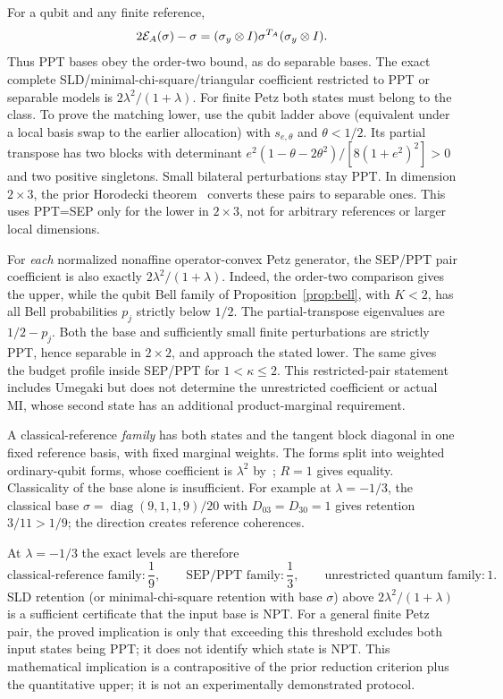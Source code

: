 For a qubit and any finite reference,
\[
 2\mathcal E_A(\sigma)-\sigma=(\sigma_y\otimes I)\sigma^{T_A}(\sigma_y\otimes I).
\]
Thus PPT bases obey the order-two bound, as do separable bases. The exact complete SLD/minimal-chi-square/triangular coefficient restricted to PPT or separable models is
\(2\lambda^2/(1+\lambda)\). For finite Petz both states must belong to the class.
To prove the matching lower, use the qubit ladder above (equivalent under a local basis swap to the earlier allocation) with \(s_{e,\theta}\) and \(\theta<1/2\). Its partial transpose has two blocks with determinant
\(e^2(1-\theta-2\theta^2)/[8(1+e^2)^2]>0\) and two positive singletons. Small bilateral perturbations stay PPT. In dimension \(2\times3\), the prior Horodecki theorem~\cite{HHH} converts these pairs to separable ones. This uses PPT=SEP only for the lower in \(2\times3\), not for arbitrary references or larger local dimensions.

For \emph{each} normalized nonaffine operator-convex Petz generator, the SEP/PPT pair coefficient is also exactly \(2\lambda^2/(1+\lambda)\). Indeed, the order-two comparison gives the upper, while the qubit Bell family of Proposition~\ref{prop:bell}, with \(K<2\), has all Bell probabilities \(p_j\) strictly below \(1/2\). The partial-transpose eigenvalues are \(1/2-p_j\). Both the base and sufficiently small finite perturbations are strictly PPT, hence separable in \(2\times2\), and approach the stated lower. The same gives the budget profile inside SEP/PPT for \(1<\kappa\le2\). This restricted-pair statement includes Umegaki but does not determine the unrestricted coefficient or actual MI, whose second state has an additional product-marginal requirement.

A classical-reference \emph{family} has both states and the tangent block diagonal in one fixed reference basis, with fixed marginal weights. The forms split into weighted ordinary-qubit forms, whose coefficient is \(\lambda^2\) by~\cite{HR}; \(R=1\) gives equality. Classicality of the base alone is insufficient. For example at \(\lambda=-1/3\), the classical base \(\sigma=\operatorname{diag}(9,1,1,9)/20\) with \(D_{03}=D_{30}=1\) gives retention \(3/11>1/9\); the direction creates reference coherences.

At \(\lambda=-1/3\) the exact levels are therefore
\[
 \text{classical-reference family}:\frac19,\qquad
 \text{SEP/PPT family}:\frac13,\qquad
 \text{unrestricted quantum family}:1.
\]
SLD retention (or minimal-chi-square retention with base \(\sigma\)) above \(2\lambda^2/(1+\lambda)\) is a sufficient certificate that the input base is NPT. For a general finite Petz pair, the proved implication is only that exceeding this threshold excludes both input states being PPT; it does not identify which state is NPT. This mathematical implication is a contrapositive of the prior reduction criterion plus the quantitative upper; it is not an experimentally demonstrated protocol.
